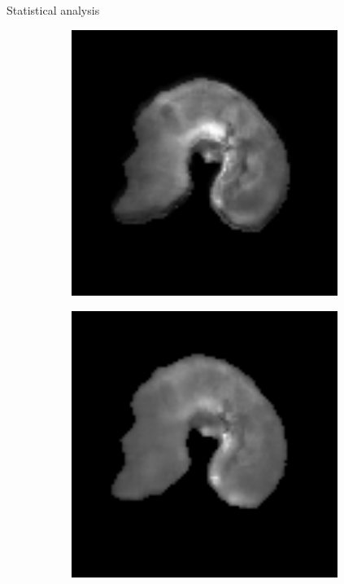\documentclass[10pt]{beamer}
\begin{document}
\begin{frame}{Statistical analysis}
\begin{figure}[ht]
\begin{subfigure}[t]{0.3\textwidth}
    \includegraphics[width=0.95\textwidth]{fig/reconstruction_t2_translated.png}
    \caption{}
    \label{subfig:reconstruction_t2_translated.png}
  \end{subfigure}%
    \begin{subfigure}[t]{0.3\textwidth}
    \centering
    \includegraphics[width=0.95\textwidth]{fig/msi_6_original.png}
    \caption{}
    \label{subfig:reconstruction_t2_translated.png}
  \end{subfigure}%
\end{figure}

\end{frame}
\end{document}
